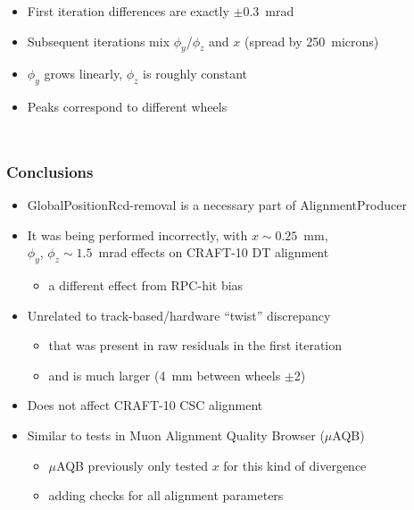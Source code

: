 \documentclass[compress]{beamer}
\begin{document}
\begin{frame}
\begin{columns}

\begin{itemize}
\item First iteration differences are exactly $\pm$0.3~mrad
\item Subsequent iterations mix $\phi_y$/$\phi_z$ and $x$ (spread by 250~microns)
\item $\phi_y$ grows linearly, $\phi_z$ is roughly constant
\item Peaks correspond to different wheels
\end{itemize}

\end{columns}
\end{frame}

\begin{frame}
\frametitle{Conclusions}

\begin{itemize}\setlength{\itemsep}{0.25 cm}
\item GlobalPositionRcd-removal is a necessary part of AlignmentProducer

\item It was being performed incorrectly, with $x \sim 0.25$~mm, \\ $\phi_y$, $\phi_z \sim 1.5$~mrad effects on CRAFT-10 DT alignment
\begin{itemize}
\item a different effect from RPC-hit bias
\end{itemize}

\item Unrelated to track-based/hardware ``twist'' discrepancy
\begin{itemize}
\item that was present in raw residuals in the first iteration
\item and is much larger (4~mm between wheels $\pm$2)
\end{itemize}

\item Does not affect CRAFT-10 CSC alignment

\item Similar to tests in Muon Alignment Quality Browser ($\mu$AQB)
\begin{itemize}
\item $\mu$AQB previously only tested $x$ for this kind of divergence
\item adding checks for all alignment parameters
\end{itemize}
\end{itemize}

\label{numpages}
\end{frame}
\end{document}
